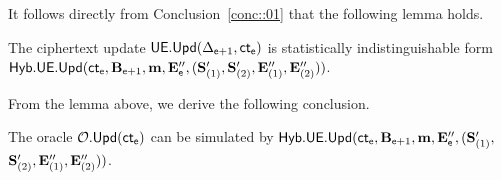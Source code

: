 \documentclass{fundam}
\begin{document}

\vspace{1cm}

\noindent It follows directly from Conclusion~\ref{conc::01} that the following lemma holds.
\begin{lemma}
	The ciphertext update  $\mathsf{UE.Upd}( \Delta_{\mathsf{e}+1}, \mathsf{ct}_{\mathsf{e}})$ is statistically indistinguishable form \\$\mathsf{Hyb.UE.Upd}(\mathsf{ct}_{\mathsf{e}}, \mathbf{B}_{\mathsf{e}+1},\mathbf{m}, \mathbf{E}_{\mathsf{e}}'', (\mathbf{S}_{(1)}', \mathbf{S}_{(2)}', \mathbf{E}_{(1)}'', \mathbf{E}_{(2)}''))$.	
\end{lemma}	


\noindent From the lemma above, we derive the following conclusion.
\begin{concl}\label{conc::02}
	The oracle $\mathcal{O}.\mathsf{Upd}(\mathsf{ct}_{\mathsf{e}})$ can be simulated by $\mathsf{Hyb.UE.Upd}(\mathsf{ct}_{\mathsf{e}}, \mathbf{B}_{\mathsf{e}+1},\mathbf{m}, \mathbf{E}_{\mathsf{e}}'', (\mathbf{S}_{(1)}',$ $\mathbf{S}_{(2)}', \mathbf{E}_{(1)}'', \mathbf{E}_{(2)}''))$.	
\end{concl}
\end{document}
